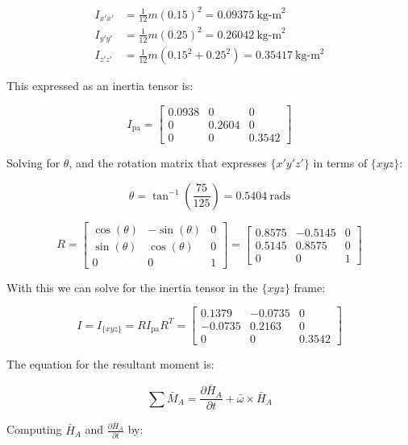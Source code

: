 \documentclass[12pt, letterpaper]{../assignment}
\begin{document}
\begin{equation*}
    \begin{aligned}
        I_{x'x'} &= \frac{1}{12} m \left( 0.15 \right)^2 = 0.09375 \ \text{kg-m}^2 \\
        I_{y'y'} &= \frac{1}{12} m \left( 0.25 \right)^2 = 0.26042 \ \text{kg-m}^2\\
        I_{z'z'} &= \frac{1}{12} m \left(0.15^2 +0.25^2 \right) = 0.35417 \ \text{kg-m}^2
    \end{aligned}
\end{equation*}

This expressed as an inertia tensor is:

$$ I_\text{pa} = \left[\begin{array}{ccc} 0.0938 & 0 & 0\\ 0 & 0.2604 & 0\\ 0 & 0 & 0.3542 \end{array}\right] $$

Solving for $\theta$, and the rotation matrix that expresses $\{x'y'z'\}$ in terms of $\{xyz\}$:

$$ \theta = \tan^{-1}\left(\frac{75}{125}\right) = 0.5404\ \text{rads} $$

$$ R = \left[\begin{array}{ccc} \cos\left(\theta \right) & -\sin\left(\theta \right) & 0\\ \sin\left(\theta \right) & \cos\left(\theta \right) & 0\\ 0 & 0 & 1 \end{array}\right]
= \left[\begin{array}{rrr} 0.8575 & -0.5145 & 0\\ 0.5145 & 0.8575 & 0\\ 0 & 0 & 1 \end{array}\right]$$

With this we can solve for the inertia tensor in the $\{xyz\}$ frame:

$$ I = I_{\{xyz\}} =  R I_\text{pa} R^T =
\left[\begin{array}{ccc} 0.1379 & -0.0735 & 0\\ -0.0735 & 0.2163 & 0\\ 0 & 0 & 0.3542 \end{array}\right] $$

The equation for the resultant moment is:

$$ \sum \bar{M}_A = \frac{\partial \bar{H}_A}{\partial t} + \bar{\omega} \times \bar{H}_A $$

Computing $\bar{H}_A$ and $\frac{\partial \bar{H}_A}{\partial t}$ by:
\end{document}
